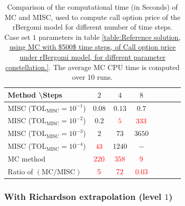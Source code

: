 \begin{table}[htbp]
	\centering
	\begin{tabular}{l*{6}{c}r}
		Method \textbackslash  Steps            & $2$ & $4$ & $8$   \\
		\hline
		MISC ($\text{TOL}_{\text{MISC}}=10^{-1}$)  & $0.08$ & $0.13$ & $0.7$   \\
		MISC ($\text{TOL}_{\text{MISC}}=10^{-2}$)  & $0.2$& ${\color{red}5}$ & ${\color{red}333}$   \\
		MISC ($\text{TOL}_{\text{MISC}}=10^{-3}$)  &  $2$ & $73$ & $3650$  \\		
		MISC ($\text{TOL}_{\text{MISC}}=10^{-4}$)  & ${\color{red}43}$ & $1240$ & $-$  \\	
	
		\hline
		MC method & ${\color{red}220}$  & ${\color{red}358}$  & ${\color{red}9}$  \\
		\hline	
		Ratio of $\left(\text{MC}/ \text{MISC} \right)$  &${\color{red}5}$ & ${\color{red}   72 
		}$  & ${\color{red}  0.03	}$   \\
		\hline
	\end{tabular}
	\caption{Comparison of the computational time (in Seconds) of  MC and MISC, used to compute call option price of the rBergomi model for different number of time steps. Case  set $1$ parameters in table \ref{table:Reference solution, using MC with $500$ time steps, of Call option price under rBergomi model, for different parameter constellation.}. The
		average MC CPU time is computed over 10 runs.}
	\label{Comparsion of the computational time of  MC and MISC, used to compute Call option price of rBergomi model for different number of time steps. Case $K=1, H=0.07$, linear}
\end{table}
\FloatBarrier
\subsubsection*{With Richardson extrapolation (level $1$)}

